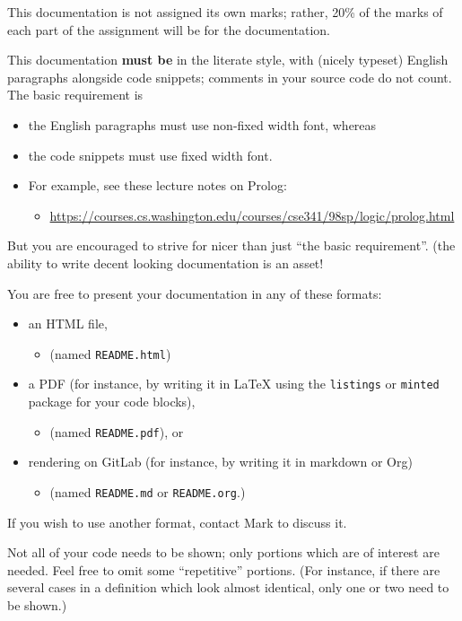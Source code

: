 \documentclass[11pt]{article}
\theoremstyle{definition}
\begin{document}
This documentation is not assigned its own marks;
rather, 20\% of the marks of each part of the assignment
will be for the documentation.

This documentation \textbf{must be} in the literate style,
with (nicely typeset) English paragraphs alongside code snippets;
comments in your source code do not count.
The basic requirement is
\begin{itemize}
\item the English paragraphs must use non-fixed width font, whereas
\item the code snippets must use fixed width font.
\item For example, see these lecture notes on Prolog:
\begin{itemize}
\item \url{https://courses.cs.washington.edu/courses/cse341/98sp/logic/prolog.html}
\end{itemize}
\end{itemize}
But you are encouraged to strive for nicer than just
“the basic requirement”.
(the ability to write decent looking documentation is an asset!

You are free to present your documentation in any of these formats:
\begin{itemize}
\item an HTML file,
\begin{itemize}
\item (named \texttt{README.html})
\end{itemize}
\item a PDF (for instance, by writing it in \LaTeX{} using
the \texttt{listings} or \texttt{minted} package for your code blocks),
\begin{itemize}
\item (named \texttt{README.pdf}), or
\end{itemize}
\item rendering on GitLab (for instance, by writing it in markdown or Org)
\begin{itemize}
\item (named \texttt{README.md} or \texttt{README.org}.)
\end{itemize}
\end{itemize}
If you wish to use another format, contact Mark to discuss it.

Not all of your code needs to be shown;
only portions which are of interest are needed.
Feel free to omit some “repetitive” portions.
(For instance, if there are several cases in a definition
which look almost identical, only one or two need to be shown.)
\end{document}

